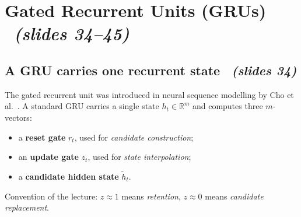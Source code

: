 \documentclass[11pt,a4paper]{article}
\newcommand{\R}{\mathbb{R}}
\newcommand{\thh}{\tilde h}
\newcommand{\sltag}[1]{\texorpdfstring{\ \emph{(slides #1)}}{ (slides #1)}}
\begin{document}



\section{Gated Recurrent Units (GRUs) \sltag{34--45}}

\subsection{A GRU carries one recurrent state \sltag{34}}

The gated recurrent unit was introduced in neural sequence modelling by Cho et al.\ \cite{r9}. A standard GRU carries a single state $h_t\in\R^m$ and computes three $m$-vectors:
\begin{itemize}
 \item a \textbf{reset gate} $r_t$, used for \emph{candidate construction};
 \item an \textbf{update gate} $z_t$, used for \emph{state interpolation};
 \item a \textbf{candidate hidden state} $\thh_t$.
\end{itemize}
Convention of the lecture: $z\approx1$ means \emph{retention}, $z\approx0$ means \emph{candidate replacement}.
\end{document}
